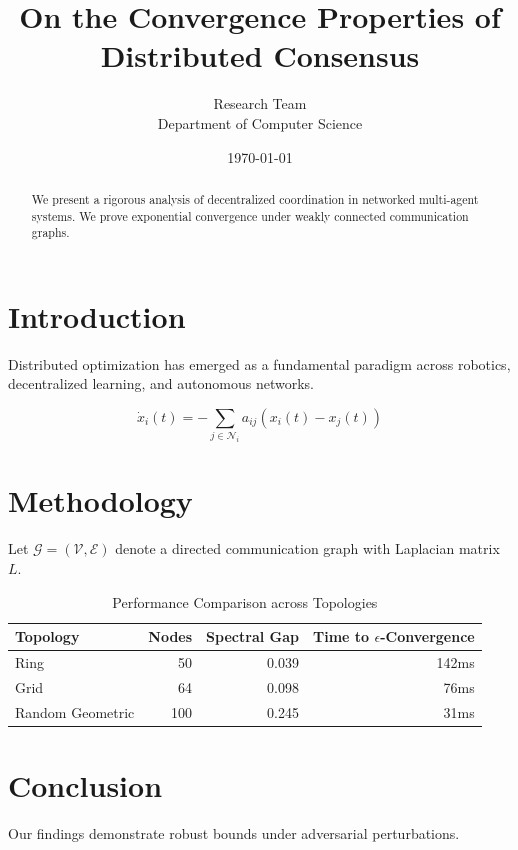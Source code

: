 \documentclass[11pt,a4paper]{article}
\title{On the Convergence Properties of Distributed Consensus}
\author{Research Team \\ Department of Computer Science}
\date{\today}
\begin{document}
\maketitle

\begin{abstract}
We present a rigorous analysis of decentralized coordination in networked multi-agent systems. We prove exponential convergence under weakly connected communication graphs.
\end{abstract}

\section{Introduction}
Distributed optimization has emerged as a fundamental paradigm across robotics, decentralized learning, and autonomous networks.

\begin{equation}
  \dot{x}_i(t) = -\sum_{j \in \mathcal{N}_i} a_{ij} (x_i(t) - x_j(t))
\end{equation}

\section{Methodology}
Let $\mathcal{G} = (\mathcal{V}, \mathcal{E})$ denote a directed communication graph with Laplacian matrix $L$.

\begin{table}[h]
  \centering
  \caption{Performance Comparison across Topologies}
  \begin{tabular}{lrrr}
    \toprule
    Topology & Nodes & Spectral Gap & Time to $\epsilon$-Convergence \\
    \midrule
    Ring & 50 & 0.039 & 142ms \\
    Grid & 64 & 0.098 & 76ms \\
    Random Geometric & 100 & 0.245 & 31ms \\
    \bottomrule
  \end{tabular}
\end{table}

\section{Conclusion}
Our findings demonstrate robust bounds under adversarial perturbations.



\end{document}
